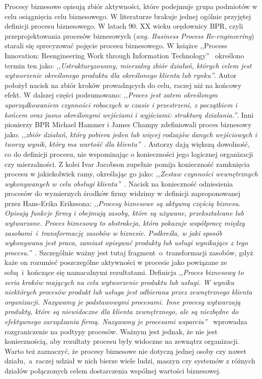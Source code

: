 Procesy biznesowe opisują zbiór aktywności, które podejmuje grupa podmiotów w celu osiągnięcia celu biznesowego. W literaturze brakuje jednej ogólnie przyjętej definicji procesu biznesowego. W latach 90. XX wieku orędownicy BPR, czyli przeprojektowania procesów biznesowych (\textit{ang. Business Process Re-engineering}) starali się sprecyzować pojęcie procesu biznesowego. W książce ,,Process Innovation: Reengineering Work through Information Technology''~\cite{davenport1993process} określono termin ten jako: \textit{,,Ustrukturyzowany, mierzalny zbiór działań, których celem jest wytworzenie określonego produktu dla określonego klienta lub rynku''}. Autor położył nacisk na zbiór kroków prowadzących do celu, raczej niż na końcowy efekt. W dalszej części podsumowano: \textit{,,Proces jest zatem określonym uporządkowaniem czynności roboczych w czasie i przestrzeni, z początkiem i końcem oraz jasno określonymi wejściami i wyjściami: strukturą działania.''}. Inni pionierzy BPR Michael Hammer i James Champy zdefiniowali proces biznesowy jako: \textit{,,zbiór działań, który pobiera jeden lub więcej rodzajów danych wejściowych i tworzy wynik, który ma wartość dla klienta''}~\cite{HAMMER199390}. Autorzy dają większą dowolność, co do definicji procesu, nie wspominając o konieczności jego logicznej organizacji czy mierzalności. Z kolei Ivar Jacobson zupełnie pomija konieczność zamknięcia procesu w jakiekolwiek ramy, określając go jako: \textit{,,Zestaw czynności wewnętrznych wykonywanych w celu obsługi klienta''}~\cite{JacobsonObjectAdvantage}. Nacisk na konieczność odniesienia procesów do wymiernych środków firmy widzimy w definicji zaproponowanej przez Hans-Erika Erikssona: \textit{,,Procesy biznesowe są aktywną częścią biznesu. Opisują funkcje firmy i obejmują zasoby, które są używane, przekształcane lub wytwarzane. Proces biznesowy to abstrakcja, która pokazuje współpracę między zasobami~i~transformację zasobów w biznesie. Podkreśla, w jaki sposób wykonywana jest praca, zamiast opisywać produkty lub usługi wynikające z tego procesu.''}~\cite{Eriksson2000BusinessMW}. Szczególnie ważny jest tutaj fragment~o~transformacji zasobów, gdyż każe on rozumieć poszczególne aktywności w procesie jako powiązane ze sobą~i~kończące się namacalnymi rezultatami. Definicja \textit{,,Proces biznesowy to seria kroków mających na celu wytworzenie produktu lub usługi. W wyniku niektórych procesów produkt lub usługa jest odbierana przez zewnętrznego klienta organizacji. Nazywamy je podstawowymi procesami. Inne procesy wytwarzają produkty, które są niewidoczne dla klienta zewnętrznego, ale są niezbędne do efektywnego zarządzania firmą. Nazywamy je procesami wsparcia''}~\cite{rummler_brache_1995} wprowadza rozgraniczenie na podtypy procesów. Ważnym jest jednak, że nie jest koniecznością, aby rezultaty procesu były widoczne na zewnątrz organizacji. Warto też zaznaczyć, że procesy biznesowe nie dotyczą jednej osoby czy nawet działu,~a~raczej udział w nich bierze wiele ludzi, maszyn czy systemów z różnych działów połączonych celem dostarczenia wspólnej wartości biznesowej.


